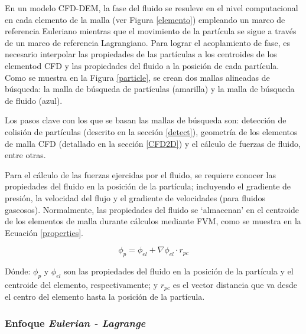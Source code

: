 \noindent
\justify

En un modelo CFD-DEM, la fase del fluido se resuleve en el nivel computacional en cada elemento de la malla (ver Figura \ref{elemento}) empleando un marco de referencia Euleriano mientras que el movimiento de la part\'icula se sigue a trav\'es de un marco de referencia Lagrangiano. Para lograr el acoplamiento de fase, es necesario interpolar las propiedades de las part\'iculas a los centroides de los elementod CFD y las propiedades del fluido a la posici\'on de cada part\'icula. Como se muestra en la Figura \ref{particle}, se crean dos mallas alineadas de b\'usqueda: la malla de b\'usqueda de part\'iculas (amarilla) y la malla de b\'usqueda de fluido (azul). 



\noindent
\justify

Los pasos clave con los que se basan las mallas de b\'usqueda son: detecci\'on de colisi\'on de part\'iculas (descrito en la secci\'on \ref{detect}), geometr\'ia de los elementos de malla CFD (detallado en la secci\'on \ref{CFD2D}) y el c\'alculo de fuerzas de fluido, entre otras.

\noindent
\justify

Para el c\'alculo de las fuerzas ejercidas por el fluido, se requiere conocer las propiedades del fluido en la posici\'on de la part\'icula; incluyendo el gradiente de presi\'on, la velocidad del flujo y el gradiente de velocidades (para fluidos gaseosos). Normalmente, las propiedades del fluido se `almacenan' en el centroide de los elementos de malla durante c\'alculos mediante FVM, como se muestra en la Ecuaci\'on \ref{properties}.

\begin{equation}
\phi _p = \phi _{el} + \nabla \phi _{el} \cdot r_{pc}
\label{properties}
\end{equation}

\noindent
\justify

D\'onde: $\phi _p$ y $\phi _{el}$ son las propiedades del fluido en la posici\'on de la part\'icula y el centroide del elemento, respectivamente; y $r_{pc}$ es el vector distancia que va desde el centro del elemento hasta la posici\'on de la part\'icula. 

\subsubsection{Enfoque \textit{Eulerian - Lagrange}}

\noindent
\justify

